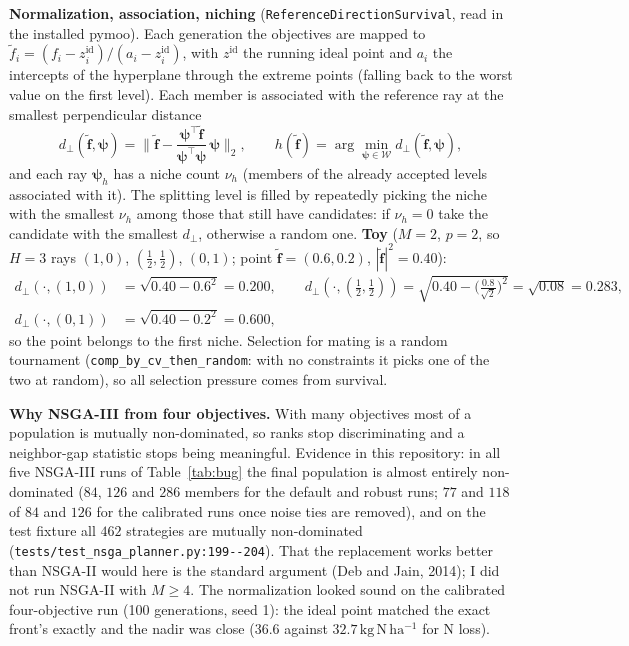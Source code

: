 \documentclass[11pt,a4paper]{article}
\newcommand{\code}[1]{\texttt{\nolinkurl{#1}}}
\newcommand{\kgNha}{\mathrm{kg\,N\,ha^{-1}}}
\begin{document}
\textbf{Normalization, association, niching} (\code{ReferenceDirectionSurvival}, read in the installed pymoo). Each generation the
objectives are mapped to $\tilde f_i=(f_i-z_i^{\mathrm{id}})/(a_i-z_i^{\mathrm{id}})$, with $z^{\mathrm{id}}$ the running ideal point and $a_i$ the
intercepts of the hyperplane through the extreme points (falling back to the worst value on the first level). Each member is associated with the reference ray at
the smallest perpendicular distance
\begin{equation}
d_\perp(\tilde{\mathbf f},\boldsymbol\psi)=\Big\|\tilde{\mathbf f}-\frac{\boldsymbol\psi^{\!\top}\tilde{\mathbf f}}{\boldsymbol\psi^{\!\top}\boldsymbol\psi}\,\boldsymbol\psi\Big\|_2 ,\qquad
h(\tilde{\mathbf f})=\arg\min_{\boldsymbol\psi\in\mathcal W}d_\perp(\tilde{\mathbf f},\boldsymbol\psi),
\label{eq:perp}
\end{equation}
and each ray $\boldsymbol\psi_h$ has a niche count $\nu_h$ (members of the already accepted levels associated with it). The splitting level is filled by repeatedly
picking the niche with the smallest $\nu_h$ among those that still have candidates: if $\nu_h=0$ take the candidate with the smallest $d_\perp$, otherwise a random one.
\textbf{Toy} ($M=2$, $p=2$, so $H=3$ rays $(1,0)$, $(\tfrac12,\tfrac12)$, $(0,1)$; point $\tilde{\mathbf f}=(0.6,0.2)$, $|\tilde{\mathbf f}|^2=0.40$):
\begin{equation}
\begin{aligned}
d_\perp(\cdot,(1,0))&=\sqrt{0.40-0.6^2}=0.200,\qquad
d_\perp(\cdot,(\tfrac12,\tfrac12))=\sqrt{0.40-\big(\tfrac{0.8}{\sqrt2}\big)^2}=\sqrt{0.08}=0.283,\\
d_\perp(\cdot,(0,1))&=\sqrt{0.40-0.2^2}=0.600 ,
\end{aligned}
\end{equation}
so the point belongs to the first niche. Selection for mating is a random tournament (\code{comp_by_cv_then_random}: with no constraints it picks one of the
two at random), so all selection pressure comes from survival.

\textbf{Why NSGA-III from four objectives.} With many objectives most of a population is mutually non-dominated, so ranks stop discriminating and a
neighbor-gap statistic stops being meaningful. Evidence in this repository: in all five NSGA-III runs of Table~\ref{tab:bug} the final
population is almost entirely non-dominated ($84$, $126$ and $286$ members for the default and robust runs; $77$ and $118$ of $84$ and $126$ for the calibrated runs once noise ties are removed), and on the test fixture all $462$ strategies are mutually non-dominated
(\code{tests/test_nsga_planner.py:199--204}). That the replacement works better than NSGA-II would here is the standard argument (Deb and Jain, 2014); I did not
run NSGA-II with $M\ge4$. The normalization looked sound on the calibrated four-objective run (100 generations, seed 1): the ideal point matched the exact front's
exactly and the nadir was close ($36.6$ against $32.7\,\kgNha$ for N loss).
\end{document}
